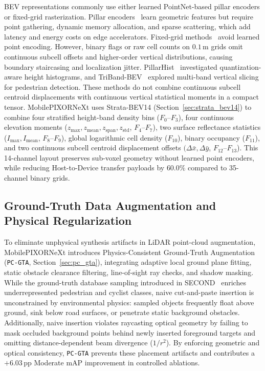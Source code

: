 BEV representations commonly use either learned PointNet-based pillar encoders or fixed-grid rasterization. Pillar encoders~\cite{lang2019pointpillars,li2023pillarnext} learn geometric features but require point gathering, dynamic memory allocation, and sparse scattering, which add latency and energy costs on edge accelerators. Fixed-grid methods~\cite{yang2018pixor,nguyen2024indoor} avoid learned point encoding. However, binary flags or raw cell counts on $0.1\,\text{m}$ grids omit continuous subcell offsets and higher-order vertical distributions, causing boundary staircasing and localization jitter. PillarHist~\cite{zhou2025pillarhist} investigated quantization-aware height histograms, and TriBand-BEV~\cite{khoshkdahan2026triband} explored multi-band vertical slicing for pedestrian detection. These methods do not combine continuous subcell centroid displacements with continuous vertical statistical moments in a compact tensor. MobilePIXORNeXt uses Strata-BEV14 (Section~\ref{sec:strata_bev14}) to combine four stratified height-band density bins ($F_0$--$F_3$), four continuous elevation moments ($z_{\max}, z_{\mathrm{mean}}, z_{\mathrm{span}}, z_{\mathrm{std}}$, $F_4$--$F_7$), two surface reflectance statistics ($I_{\max}, I_{\mathrm{mean}}$, $F_8$--$F_9$), global logarithmic cell density ($F_{10}$), binary occupancy ($F_{11}$), and two continuous subcell centroid displacement offsets $(\Delta\bar{x}, \Delta\bar{y}$, $F_{12}$--$F_{13}$). This 14-channel layout preserves sub-voxel geometry without learned point encoders, while reducing Host-to-Device transfer payloads by $60.0\%$ compared to 35-channel binary grids.

\subsection{Ground-Truth Data Augmentation and Physical Regularization}
\label{sec:rel_gt_augmentation}

To eliminate unphysical synthesis artifacts in LiDAR point-cloud augmentation, MobilePIXORNeXt introduces Physics-Consistent Ground-Truth Augmentation (\texttt{PC-GTA}, Section~\ref{sec:pc_gta}), integrating adaptive local ground plane fitting, static obstacle clearance filtering, line-of-sight ray checks, and shadow masking. While the ground-truth database sampling introduced in SECOND~\cite{yan2018second} enriches underrepresented pedestrian and cyclist classes, naive cut-and-paste insertion is unconstrained by environmental physics: sampled objects frequently float above ground, sink below road surfaces, or penetrate static background obstacles. Additionally, naive insertion violates raycasting optical geometry by failing to mask occluded background points behind newly inserted foreground targets and omitting distance-dependent beam divergence ($1/r^2$). By enforcing geometric and optical consistency, \texttt{PC-GTA} prevents these placement artifacts and contributes a $+6.03\,\text{pp}$ Moderate mAP improvement in controlled ablations.

